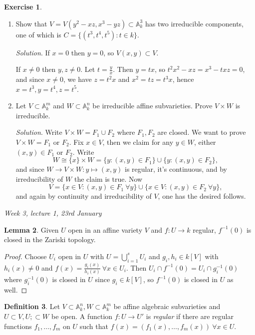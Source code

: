 \documentclass{article}
\newcommand{\A}{\mathbb{A}}
\theoremstyle{definition}
\newtheorem{defn}{Definition}[subsection]
\newtheorem{lemma}[defn]{Lemma}
\newtheorem{exe}[defn]{Exercise}
\begin{document}
\begin{exe}
\begin{enumerate}
\item Show that $V=V(y^2-xz,x^3-yz)\subset\A_k^3$ has two irreducible components, one of which is $C=\{(t^3,t^4,t^5):t\in k\}$.

\textit{Solution}. If $x=0$ then $y=0$, so $V(x,y)\subset V$.

If $x\neq 0$ then $y,z\neq 0$. Let $t=\frac{y}{x}$. Then $y=tx$, so $t^2x^2-xz=x^3-txz=0$, and since $x\neq 0$, we have $z=t^2x$ and $x^2=tz=t^3x$, hence $x=t^3,y=t^4,z=t^5$.

\item Let $V\subset\A_k^m$ and $W\subset\A_k^n$ be irreducible affine subvarieties. Prove $V\times W$ is irreducible.

\textit{Solution}. Write $V\times W=F_1\cup F_2$ where $F_1,F_2$ are closed. We want to prove $V\times W=F_1$ or $F_2$. Fix $x\in V$, then we claim for any $y\in W$, either $(x,y)\in F_1$ or $F_2$. Write
\[
W\cong\{x\}\times W=\{y:(x,y)\in F_1\}\cup \{y:(x,y)\in F_2\},
\]
and since $W\rightarrow V\times W:y\mapsto (x,y)$ is regular, it's continuous, and by irreducibility of $W$ the claim is true. Now
\[
V=\{x\in V:(x,y)\in F_1 \ \forall y\}\cup \{x\in V:(x,y)\in F_2 \ \forall y\},
\]
and again by continuity and irreducibility of $V$, one has the desired follows.
\end{enumerate}
\end{exe}

\begin{flushright}
\textit{Week 3, lecture 1, 23rd January}
\end{flushright}

\begin{lemma}
Given $U$ open in an affine variety $V$ and $f:U\rightarrow k$ regular, $f^{-1}(0)$ is closed in the Zariski topology.
\end{lemma}
\begin{proof}
Choose $U_i$ open in $U$ with $U=\bigcup_{i=1}^s U_i$ and $g_i,h_i\in k[V]$ with $h_i(x)\neq 0$ and $f(x)=\frac{g_i(x)}{h_i(x)} \ \forall x\in U_i$. Then $U_i\cap f^{-1}(0)=U_i\cap g_i^{-1}(0)$ where $g_i^{-1}(0)$ is closed in $U$ since $g_i\in k[V]$, so $f^{-1}(0)$ is closed in $U$ as well.
\end{proof}

\begin{defn}
Let $V\subset\A_k^n,W\subset\A_k^m$ be affine algebraic subvarieties and $U\subset V,U;\subset W$ be open. A function $f:U\rightarrow U'$ is \textit{regular} if there are regular functions $f_1,\ldots,f_m$ on $U$ such that $f(x)=(f_1(x),\ldots,f_m(x)) \ \forall x\in U$.
\end{defn}
\end{document}
